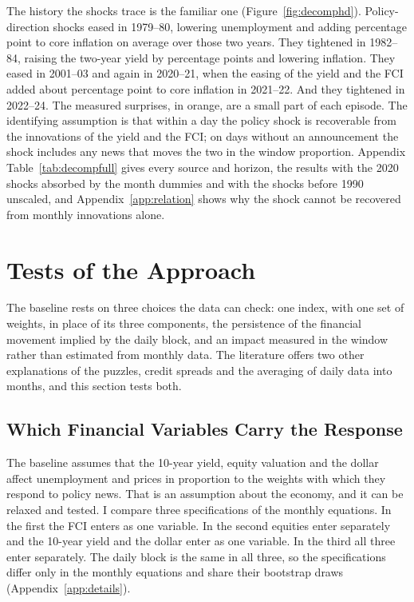 \documentclass[11pt]{article}
\begin{document}


The history the shocks trace is the familiar one (Figure~\ref{fig:decomphd}). Policy-direction shocks eased in 1979--80, lowering unemployment and adding  percentage point to core inflation on average over those two years. They tightened in 1982--84, raising the two-year yield by  percentage points and lowering inflation. They eased in 2001--03 and again in 2020--21, when the easing of the yield and the FCI added about  percentage point to core inflation in 2021--22. And they tightened in 2022--24. The measured surprises, in orange, are a small part of each episode. The identifying assumption is that within a day the policy shock is recoverable from the innovations of the yield and the FCI; on days without an announcement the shock includes any news that moves the two in the window proportion. Appendix Table~\ref{tab:decompfull} gives every source and horizon, the results with the 2020 shocks absorbed by the month dummies and with the shocks before 1990 unscaled, and Appendix~\ref{app:relation} shows why the shock cannot be recovered from monthly innovations alone.

\FloatBarrier
\section{Tests of the Approach}\label{sec:tests}
The baseline rests on three choices the data can check: one index, with one set of weights, in place of its three components, the persistence of the financial movement implied by the daily block, and an impact measured in the window rather than estimated from monthly data. The literature offers two other explanations of the puzzles, credit spreads and the averaging of daily data into months, and this section tests both.

\subsection{Which Financial Variables Carry the Response}\label{sec:components}
The baseline assumes that the 10-year yield, equity valuation and the dollar affect unemployment and prices in proportion to the weights with which they respond to policy news. That is an assumption about the economy, and it can be relaxed and tested. I compare three specifications of the monthly equations. In the first the FCI enters as one variable. In the second equities enter separately and the 10-year yield and the dollar enter as one variable. In the third all three enter separately. The daily block is the same in all three, so the specifications differ only in the monthly equations and share their bootstrap draws (Appendix~\ref{app:details}).
\end{document}
